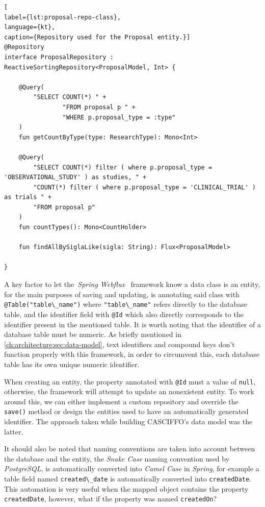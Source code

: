 \begin{lstlisting}[
label={lst:proposal-repo-class},
language={kt},
caption={Repository used for the Proposal entity.}]
@Repository
interface ProposalRepository : ReactiveSortingRepository<ProposalModel, Int> {

    @Query(
        "SELECT COUNT(*) " +
                "FROM proposal p " +
                "WHERE p.proposal_type = :type"
    )
    fun getCountByType(type: ResearchType): Mono<Int>

    @Query(
        "SELECT COUNT(*) filter ( where p.proposal_type = 'OBSERVATIONAL_STUDY' ) as studies, " +
        "COUNT(*) filter ( where p.proposal_type = 'CLINICAL_TRIAL' ) as trials " +
        "FROM proposal p"
    )
    fun countTypes(): Mono<CountHolder>
    
    fun findAllBySiglaLike(sigla: String): Flux<ProposalModel>

}    
\end{lstlisting}

A key factor to let the~\textit{Spring Webflux}~\cite{spring-webflux} framework know a data class is an entity, for the main purposes of saving and updating, is annotating said class with \lstinline{@Table("table\_name")} where \lstinline{"table\_name"} refers directly to the database table, and the identifier field with \lstinline{@Id} which also directly corresponds to the identifier present in the mentioned table. It is worth noting that the identifier of a database table must be numeric. As briefly mentioned in \cref{ch:architecture:sec:data-model}, text identifiers and compound keys don't function properly with this framework, in order to circumvent this, each database table has its own unique numeric identifier. 

When creating an entity, the property annotated with \lstinline{@Id} must a value of \lstinline{null}, otherwise, the framework will attempt to update an nonexistent entity. To work around this, we can either implement a custom repository and override the \lstinline{save()} method or design the entities used to have an automatically generated identifier. The approach taken while building CASCIFFO's data model was the latter.

It should also be noted that naming conventions are taken into account between the database and the entity, the \textit{Snake Case} naming convention used by \textit{PostgreSQL}, is automatically converted into \textit{Camel Case} in \textit{Spring}, for example a table field named \lstinline{created\_date} is automatically converted into \lstinline{createdDate}. 
This automation is very useful when the mapped object contains the property \lstinline{createdDate}, however, what if the property was named \lstinline{createdOn}?


